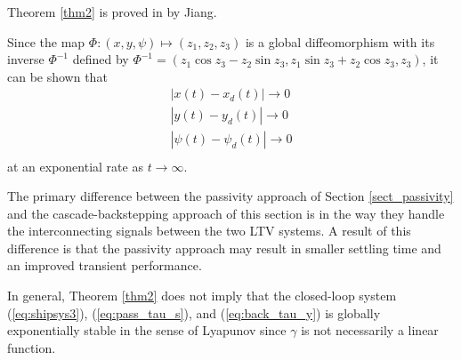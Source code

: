 \documentclass[amsthm, twocolumn]{autart}
\begin{document}
{\begin{theorem}
\label{thm2}
\end{theorem}
%
%
Theorem \ref{thm2} is proved in \cite{Jiang02} by Jiang.
%
\begin{remark}
Since the map $\Phi:(x,y,\psi) \mapsto (z_1,z_2,z_3)$ is a global diffeomorphism with its inverse $\Phi^{-1}$ defined by $\Phi^{-1}=(z_1 \cos z_3- z_2 \sin z_3, z_1 \sin z_3 + z_2 \cos z_3, z_3)$, it can be shown that 
\begin{equation*}
\begin{aligned}
|x(t)-x_d(t)| \rightarrow 0\\
|y(t)-y_d(t)| \rightarrow 0\\
|\psi(t)-\psi_d(t)| \rightarrow 0\\
\end{aligned}
\end{equation*}
at an exponential rate as $t \rightarrow \infty$.
\end{remark}
%
\begin{remark}
The primary difference between the passivity approach of Section \ref{sect_passivity} and the cascade-backstepping approach of this section is in the way they handle the interconnecting signals between the two LTV systems. A result of this difference is that the passivity approach may result in smaller settling time and an improved transient performance.
\end{remark}
%
\begin{remark}
In general, Theorem \ref{thm2} does not imply that the closed-loop system (\ref{eq:shipsys3}), (\ref{eq:pass_tau_s}), and (\ref{eq:back_tau_y}) is globally exponentially stable in the sense of Lyapunov since $\gamma$ is not necessarily a linear function. 
\end{remark}
%
%
%
%
%
}
\end{document}
